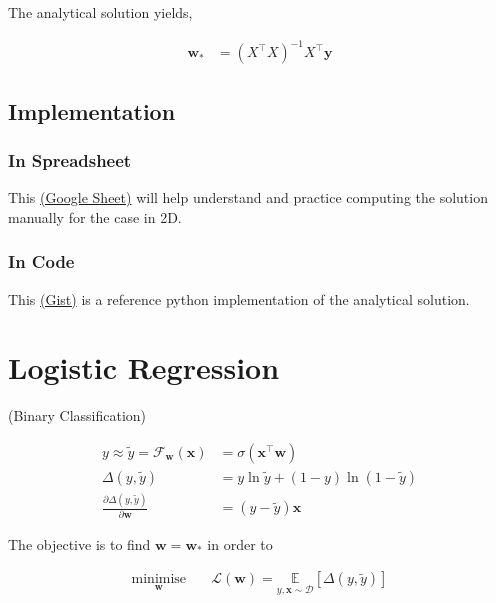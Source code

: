 \documentclass[11pt]{article}
\begin{document}
The analytical solution yields,

\begin{align*}
  \mathbf{w}_* &= (X^{\top}X)^{-1}X^{\top}\mathbf{y}
\end{align*}

\subsection{Implementation}
\label{sec:org5affadd}

\subsubsection{In Spreadsheet}
\label{sec:org921f605}
This \href{https://docs.google.com/spreadsheets/d/1MrwsA75WUano\_aKpeOibALiCOumbdiQv-609A6fEC-c/edit?usp=sharing}{(Google Sheet)} will help understand and practice
computing the solution manually for the case in 2D.
\subsubsection{In Code}
\label{sec:orgc8a6169}
This \href{https://gist.github.com/bvraghav/4b81c850cd7f3c9784493a465ba592ca}{(Gist)} is a reference python implementation of the
analytical solution.


\section{Logistic Regression}
\label{sec:orgf76aa50}

(Binary Classification)

\begin{align*}
  y \approx \widetilde{y} = \mathcal{F}_{\mathbf{w}}(\mathbf{x})
  &= \sigma(\mathbf{x}^{\top}\mathbf{w}) \\
  \Delta\left(y, \widetilde{y} \right)
  &= y\ln \widetilde{y} + (1-y)
    \ln (1-\widetilde{y}) \\
  \frac{\partial \Delta(y,\widetilde{y})} {\partial
  \mathbf{w}}
  &= (y-\widetilde{y})\mathbf{x}
\end{align*}

The objective is to find \(\mathbf{w}=\mathbf{w}_*\) in
order to

\begin{align*}
  \underset{\mathbf{w}}{\text{minimise}}
  &\quad \mathcal{L}(\mathbf{w}) = \underset{y,
    \mathbf{x} \sim \mathcal{D}}{\mathbb{E}}
    \left[ \Delta\left(y, \widetilde{y} \right) \right]
\end{align*}
\end{document}
